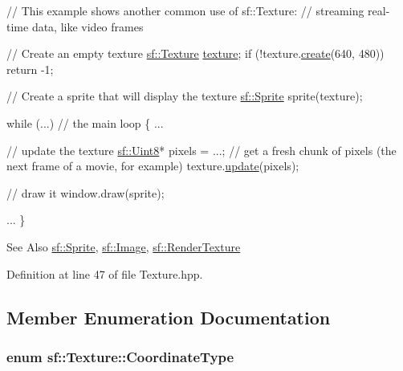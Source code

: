\begin{DoxyCode}
\textcolor{comment}{// This example shows another common use of sf::Texture:}
\textcolor{comment}{// streaming real-time data, like video frames}

\textcolor{comment}{// Create an empty texture}
\hyperlink{classsf_1_1_texture}{sf::Texture} \hyperlink{gl3_8h_ab21590c4736d1459a5a0674a42b5a655}{texture};
\textcolor{keywordflow}{if} (!texture.\hyperlink{classsf_1_1_texture_a89b4c7d204acf1033c3a1b6e0a3ad0a3}{create}(640, 480))
    \textcolor{keywordflow}{return} -1;

\textcolor{comment}{// Create a sprite that will display the texture}
\hyperlink{classsf_1_1_sprite}{sf::Sprite} sprite(texture);

\textcolor{keywordflow}{while} (...) \textcolor{comment}{// the main loop}
\{
    ...

    \textcolor{comment}{// update the texture}
    \hyperlink{namespacesf_a4ef3d630785c4f296f9b4f274c33d78e}{sf::Uint8}* pixels = ...; \textcolor{comment}{// get a fresh chunk of pixels (the next frame of a movie, for
       example)}
    texture.\hyperlink{classsf_1_1_texture_ae4eab5c6781316840b0c50ad08370963}{update}(pixels);

    \textcolor{comment}{// draw it}
    window.draw(sprite);

    ...
\}
\end{DoxyCode}


\begin{DoxySeeAlso}{See Also}
\hyperlink{classsf_1_1_sprite}{sf\-::\-Sprite}, \hyperlink{classsf_1_1_image}{sf\-::\-Image}, \hyperlink{classsf_1_1_render_texture}{sf\-::\-Render\-Texture} 
\end{DoxySeeAlso}


Definition at line 47 of file Texture.\-hpp.



\subsection{Member Enumeration Documentation}
\hypertarget{classsf_1_1_texture_aa6fd3bbe3c334b3c4428edfb2765a82e}{
\subsubsection[{Coordinate\-Type}]{\setlength{\rightskip}{0pt plus 5cm}enum {\bf sf\-::\-Texture\-::\-Coordinate\-Type}}}\label{classsf_1_1_texture_aa6fd3bbe3c334b3c4428edfb2765a82e}


